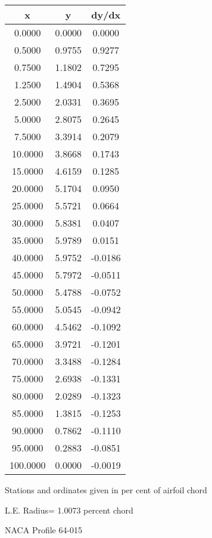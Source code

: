 \documentclass[11pt]{book}
\begin{document}
 \vspace{8mm}
 \begin{tabular}{|c|c|c|} \hline 
  x  &  y  &  dy/dx \\
 \hline
0.0000 & 0.0000 & 0.0000 \\
0.5000 & 0.9755 & 0.9277 \\
0.7500 & 1.1802 & 0.7295 \\
1.2500 & 1.4904 & 0.5368 \\
2.5000 & 2.0331 & 0.3695 \\
5.0000 & 2.8075 & 0.2645 \\
7.5000 & 3.3914 & 0.2079 \\
10.0000 & 3.8668 & 0.1743 \\
15.0000 & 4.6159 & 0.1285 \\
20.0000 & 5.1704 & 0.0950 \\
25.0000 & 5.5721 & 0.0664 \\
30.0000 & 5.8381 & 0.0407 \\
35.0000 & 5.9789 & 0.0151 \\
40.0000 & 5.9752 & -0.0186 \\
45.0000 & 5.7972 & -0.0511 \\
50.0000 & 5.4788 & -0.0752 \\
55.0000 & 5.0545 & -0.0942 \\
60.0000 & 4.5462 & -0.1092 \\
65.0000 & 3.9721 & -0.1201 \\
70.0000 & 3.3488 & -0.1284 \\
75.0000 & 2.6938 & -0.1331 \\
80.0000 & 2.0289 & -0.1323 \\
85.0000 & 1.3815 & -0.1253 \\
90.0000 & 0.7862 & -0.1110 \\
95.0000 & 0.2883 & -0.0851 \\
100.0000 & 0.0000 & -0.0019 \\
 \hline
 \end{tabular}
 \vspace{8mm}


Stations and ordinates given in per cent of airfoil chord 


L.E. Radius=  1.0073 percent chord
 \newpage
  \label{p64-015}
 \begin{Large}
 NACA Profile 64-015
 \end{Large}
  
\end{document}
